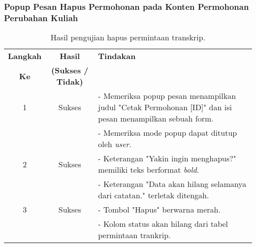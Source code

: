 \subsubsection{Popup Pesan Hapus Permohonan pada Konten Permohonan Perubahan Kuliah}
\begin{table}[H]
	\centering 
	\caption{Hasil pengujian hapus permintaan transkrip.}
	\label{hasil:HapusPerubahanKuliah}
	\begin{tabular}{|c| c| p{}|}
		\toprule
		\textbf{Langkah} & \textbf{Hasil} & \textbf{Tindakan}\\
		\textbf{Ke} & \textbf{(Sukses / Tidak)} &\\
		\midrule
		1&Sukses& - Memeriksa popup pesan menampilkan judul "Cetak Permohonan [ID]" dan isi pesan menampilkan sebuah form.\\
		&& - Memeriksa mode popup dapat ditutup oleh \textit{user}.\\
		\hline
		2&Sukses& - Keterangan "Yakin ingin menghapus?" memiliki teks berformat \textit{bold}. \\
		&& - Keterangan "Data akan hilang selamanya dari catatan." terletak ditengah.\\
		\hline
		3&Sukses&- Tombol "Hapus" berwarna merah.\\
		&& - Kolom status akan hilang dari tabel permintaan trankrip.\\		
		\bottomrule		
	\end{tabular} 
\end{table}


